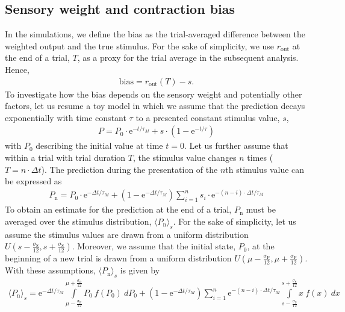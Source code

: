 \documentclass[10pt,a4paper]{article}
\begin{document}
\subsection{Sensory weight and contraction bias}
%
In the simulations, we define the bias as the trial-averaged difference between the weighted output and the true stimulus. For the sake of simplicity, we use $r_\mathrm{out}$ at the end of a trial, $T$, as a proxy for the trial average in the subsequent analysis. Hence, 
%
\begin{align}
 \mathrm{bias} = r_\mathrm{out}(T) - s.
\end{align}
%
To investigate how the bias depends on the sensory weight and potentially other factors, let us resume a toy model in which we assume that the prediction decays exponentially with time constant $\tau$ to a presented constant stimulus value, $s$,
%
\begin{align}
P = P_\mathrm{0} \cdot \mathrm{e}^{-t/\tau_M} +  s \cdot \left( 1 -   \mathrm{e}^{-t/\tau} \right)
\end{align}
%
with $P_0$ describing the initial value at time $t=0$. Let us further assume that within a trial with trial duration $T$, the stimulus value changes $n$ times ($T = n\cdot \Delta t$).  The prediction during the presentation of the $n$th stimulus value can be expressed as
%
\begin{align}
P_\mathrm{n} = P_\mathrm{0} \cdot \mathrm{e}^{-\Delta t/\tau_M}  + \left( 1 -   \mathrm{e}^{-\Delta t/\tau_M} \right) \sum_{i=1}^{n} s_i \cdot \mathrm{e}^{-(n-i)\cdot \Delta t/ \tau_M}
\end{align}
%
To obtain an estimate for the prediction at the end of a trial, $P_\mathrm{n}$ must be averaged over the stimulus distribution, $\langle P_\mathrm{n} \rangle_s$. For the sake of simplicity, let us assume the stimulus values are drawn from a uniform distribution $U\left( s - \frac{\sigma_\mathrm{S}}{12}, s + \frac{\sigma_\mathrm{S}}{12} \right)$. Moreover, we assume that the initial state, $P_0$, at the beginning of a new trial is drawn from a uniform distribution $U\left( \mu - \frac{\sigma_\mathrm{P}}{12}, \mu + \frac{\sigma_\mathrm{P}}{12} \right)$. With these assumptions, $\langle P_\mathrm{n} \rangle_s$ is given by
%
\begin{align}
\langle P_\mathrm{n} \rangle_s = \mathrm{e}^{-\Delta t/\tau_M}  \int\limits_{\mu - \frac{\sigma_\mathrm{P}}{12}}^{\mu + \frac{\sigma_\mathrm{P}}{12}} P_\mathrm{0} \ f(P_\mathrm{0})\ dP_0+ \left( 1 -   \mathrm{e}^{-\Delta t/\tau_M} \right) \sum_{i=1}^{n} \mathrm{e}^{-(n-i)\cdot \Delta t/ \tau_M} \int\limits_{s - \frac{\sigma_\mathrm{S}}{12}}^{s + \frac{\sigma_\mathrm{S}}{12}} x\ f(x)\ dx
\end{align}
\end{document}
